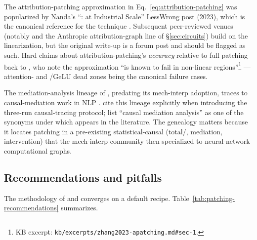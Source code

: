 \begin{forumsignal}
The attribution-patching approximation in
Eq.~\eqref{eq:attribution-patching} was popularized by Nanda's
``:  at Industrial Scale''
LessWrong post (2023), which is the canonical reference for the
technique . Subsequent
peer-reviewed venues (notably \citealt{conmy2023-acdc} and the
Anthropic attribution-graph line of \S\ref{sec:circuits}) build on
the linearization, but the original write-up is a forum post and
should be flagged as such. Hard claims about attribution-patching's
\emph{accuracy} relative to full patching back to
\citet[\S 1]{zhang2023-apatching}, who note the approximation
``is known to fail in non-linear regions''\footnote{KB excerpt:
\texttt{kb/excerpts/zhang2023-apatching.md\#sec-1}.} ---
attention-  and /GeLU dead zones being the
canonical failure cases.
\end{forumsignal}

The mediation-analysis lineage of , predating its
mech-interp adoption, traces to causal-mediation work in
NLP . \citet[\S 1]{meng2022-rome} cite
this lineage explicitly when introducing the three-run causal-tracing
protocol; \citet[\S 1]{zhang2023-apatching} list ``causal mediation
analysis'' as one of the synonyms under which 
appears in the literature. The genealogy matters because it locates
patching in a pre-existing statistical-causal 
(total/, mediation, intervention) that the
mech-interp community then specialized to neural-network
computational graphs.

\subsection{Recommendations and pitfalls}
\label{sec:patching-recommendations}

The methodology of \citet{zhang2023-apatching} and
\citet{heimersheim2024-apatching-howto} converges on a default recipe.
Table~\ref{tab:patching-recommendations} summarizes.

